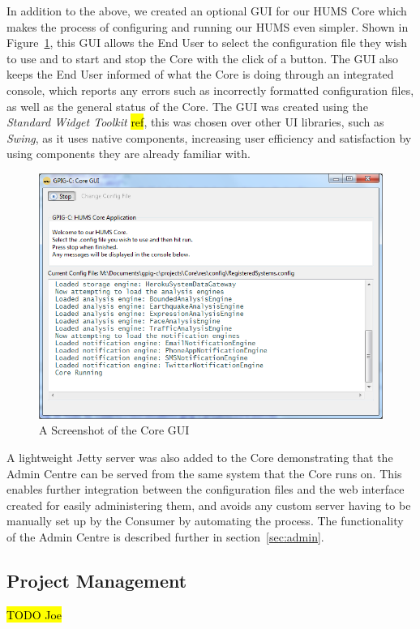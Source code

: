 \documentclass[10pt,a4paper]{article}
\begin{document}
In addition to the above, we created an optional GUI for our HUMS Core which makes the process of configuring and running our HUMS even simpler. Shown in Figure~\ref{fig:coreGUI}, this GUI allows the End User to select the configuration file they wish to use and to start and stop the Core with the click of a button. The GUI also keeps the End User informed of what the Core is doing through an integrated console, which reports any errors such as incorrectly formatted configuration files, as well as the general status of the Core. The GUI was created using the \emph{Standard Widget Toolkit} \hl{ref}, this was chosen over other UI libraries, such as \emph{Swing}, as it uses native components, increasing user efficiency and satisfaction by using components they are already familiar with.

\begin{figure}
\centering
\includegraphics[width = \textwidth]{images/coreGUI.png}
\caption{A Screenshot of the Core GUI}
\label{fig:coreGUI}
\end{figure}
A lightweight Jetty server was also added to the Core demonstrating that the Admin Centre can be served from the same system that the Core runs on. This enables further integration between the configuration files and the web interface created for easily administering them, and avoids any custom server having to be manually set up by the Consumer by automating the process. The functionality of the Admin Centre is described further in section~\ref{sec:admin}. 

\subsection{Project Management}
\hl{TODO Joe}
\end{document}
